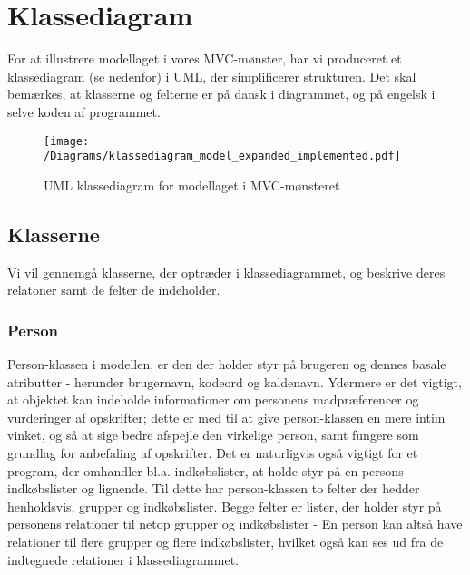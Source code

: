 \chapter{Klassediagram}
For at illustrere modellaget i vores MVC-mønster, har vi produceret et klassediagram (se  nedenfor) i UML, der simplificerer strukturen. 
Det skal bemærkes, at klasserne og felterne er på dansk i diagrammet, og på engelsk i selve koden af programmet. 

\begin{figure}[H]
\centering
\texttt{[image: /Diagrams/klassediagram\_model\_expanded\_implemented.pdf]}
\caption{UML klassediagram for modellaget i MVC-mønsteret}\label{diagram:klassediagram}
\end{figure}

\section{Klasserne}
Vi vil gennemgå klasserne, der optræder i klassediagrammet, og beskrive deres relatoner samt de felter de indeholder.

\subsection{Person}
Person-klassen i modellen, er den der holder styr på brugeren og dennes basale atributter - herunder brugernavn, kodeord og kaldenavn. 
Ydermere er det vigtigt, at objektet kan indeholde informationer om personens madpræferencer og vurderinger af opskrifter; dette er med til at give person-klassen en mere intim vinket, og så at sige bedre afspejle den virkelige person, samt fungere som grundlag for anbefaling af opskrifter. 
Det er naturligvis også vigtigt for et program, der omhandler bl.a. indkøbslister, at holde styr på en persons indkøbslister og lignende. 
Til dette har person-klassen to felter der hedder henholdsvis, grupper og indkøbslister. 
Begge felter er lister, der holder styr på personens relationer til netop grupper og indkøbslister - En person kan altså have relationer til flere grupper og flere indkøbslister, hvilket også kan ses ud fra de indtegnede relationer i klassediagrammet.

